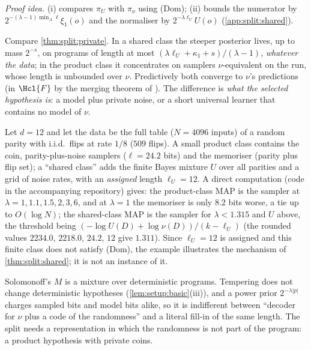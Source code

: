\emph{Proof idea.} (i) compares $\pi_U$ with $\pi_\nu$ using (Dom); (ii) bounds the numerator by $2^{-(\lambda-1)\min_A\ell}\xi_1(o)$ and the normaliser by $2^{-\lambda\ell_U}U(o)$ (\cref{app:split:shared}).

Compare \cref{thm:split:private}. In a shared class the steeper posterior lives, up to mass $2^{-s}$, on programs of length at most $(\lambda\ell_U+\kappa_1+s)/(\lambda-1)$, \emph{whatever the data}; in the product class it concentrates on samplers $\nu$-equivalent on the run, whose length is unbounded over $\nu$. Predictively both converge to $\nu$'s predictions (in $\Hcl{F}$ by the merging theorem of \citealp{claudeSFI2026fundamentals}). The difference is \emph{what the selected hypothesis is}: a model plus private noise, or a short universal learner that contains no model of $\nu$.

\begin{example}\label{ex:split:noisyparity}
Let $d=12$ and let the data be the full table ($N=4096$ inputs) of a random parity with i.i.d.\ flips at rate $1/8$ ($509$ flips). A small product class contains the coin, parity-plus-noise samplers ($\ell=24.2$ bits) and the memoriser (parity plus flip set); a ``shared class'' adds the finite Bayes mixture $U$ over all parities and a grid of noise rates, with an \emph{assigned} length $\ell_U=12$. A direct computation (code in the accompanying repository) gives: the product-class MAP is the sampler at $\lambda=1,1.1,1.5,2,3,6$, and at $\lambda=1$ the memoriser is only $8.2$ bits worse, a tie up to $O(\log N)$; the shared-class MAP is the sampler for $\lambda<1.315$ and $U$ above, the threshold being $(-\log U(D)+\log\nu(D))/(k-\ell_U)$ (the rounded values $2234.0$, $2218.0$, $24.2$, $12$ give $1.311$). Since $\ell_U=12$ is assigned and this finite class does not satisfy (Dom), the example illustrates the mechanism of \cref{thm:split:shared}; it is not an instance of it.
\end{example}

\begin{remark}\label{rem:split:siprograms}
Solomonoff's $M$ is a mixture over deterministic programs. Tempering does not change deterministic hypotheses (\cref{lem:setup:basic}(iii)), and a power prior $2^{-\lambda|p|}$ charges sampled bits and model bits alike, so it is indifferent between ``decoder for $\nu$ plus a code of the randomness'' and a literal fill-in of the same length. The split needs a representation in which the randomness is not part of the program: a product hypothesis with private coins.
\end{remark}
